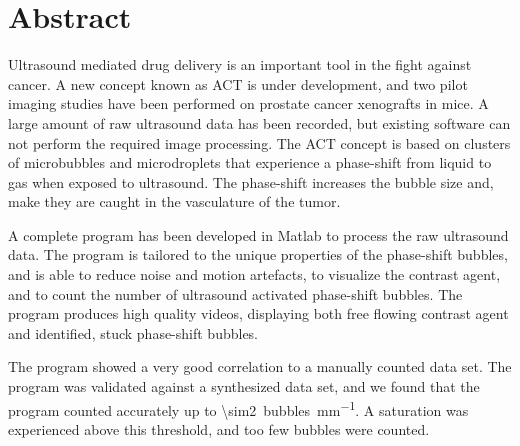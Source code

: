 \section{Abstract}
Ultrasound mediated drug delivery is an important tool in the fight against cancer. A new concept known  as ACT\texttrademark{} is under development, and two pilot imaging studies have been performed on prostate cancer xenografts in mice.  A large amount of raw ultrasound data has been recorded, but existing software can not perform the required image processing. The ACT\texttrademark{} concept is based on clusters of microbubbles and microdroplets that experience a phase-shift from liquid to gas when exposed to ultrasound. The phase-shift increases the bubble size and, make they are caught in the vasculature of the tumor. 

A complete program has been developed in Matlab\textregistered{} to process the raw ultrasound data. The program is tailored to the unique properties of the phase-shift bubbles, and is able to reduce noise and motion artefacts, to visualize the contrast agent, and to count the number of ultrasound activated phase-shift bubbles. The program produces high quality videos, displaying both free flowing contrast agent and identified, stuck phase-shift bubbles. 

The program showed a very good correlation to a manually counted data set. The program was validated against a synthesized data set, and we found that the program counted accurately up to \SI{\sim2}{bubbles\per\milli\meter}. A saturation was experienced above this threshold, and too few bubbles were counted.  

